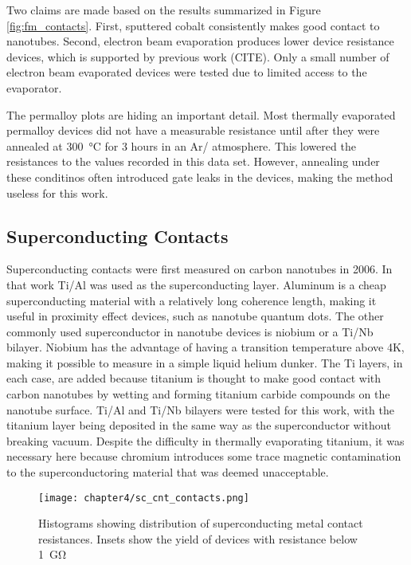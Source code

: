 Two claims are made based on the results summarized in Figure \ref{fig:fm_contacts}. First, sputtered cobalt consistently makes good contact to nanotubes. Second, electron beam evaporation produces lower device resistance devices, which is supported by previous work (CITE). Only a small number of electron beam evaporated devices were tested due to limited access to the evaporator.

The permalloy plots are hiding an important detail. Most thermally evaporated permalloy devices did not have a measurable resistance until after they were annealed at \SI{300}{\celsius} for 3 hours in an Ar/ atmosphere. This lowered the resistances to the values recorded in this data set. However, annealing under these conditinos often introduced gate leaks in the devices, making the method useless for this work.

\subsection{Superconducting Contacts}

Superconducting contacts were first measured on carbon nanotubes in 2006. In that work Ti/Al was used as the superconducting layer. Aluminum is a cheap superconducting material with a relatively long coherence length, making it useful in proximity effect devices, such as nanotube quantum dots. The other commonly used superconductor in nanotube devices is niobium or a Ti/Nb bilayer. Niobium has the advantage of having a transition temperature above 4K, making it possible to measure in a simple liquid helium dunker. The Ti layers, in each case, are added because titanium is thought to make good contact with carbon nanotubes by wetting and forming titanium carbide compounds on the nanotube surface. Ti/Al and Ti/Nb bilayers were tested for this work, with the titanium layer being deposited in the same way as the superconductor without breaking vacuum. Despite the difficulty in thermally evaporating titanium, it was necessary here because chromium introduces some trace magnetic contamination to the superconductoring material that was deemed unacceptable.

\begin{figure}
    \centering
    \texttt{[image: chapter4/sc\_cnt\_contacts.png]}
    \caption{Histograms showing distribution of superconducting metal contact resistances. Insets show the yield of devices with resistance below \SI{1}{\giga\ohm}}
    \label{fig:sc_contacts}
\end{figure}

